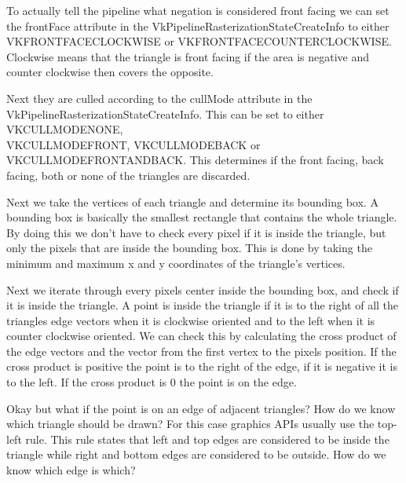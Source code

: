 \documentclass[12pt]{report} \usepackage{preamble}
\begin{document}
To actually tell the pipeline what negation is considered front facing
we can set the frontFace attribute in the VkPipelineRasterizationStateCreateInfo
to either \\
VK\textunderscore FRONT\textunderscore FACE\textunderscore CLOCKWISE or
VK\textunderscore FRONT\textunderscore FACE\textunderscore COUNTER\textunderscore CLOCKWISE.
Clockwise means that the triangle is front facing if the area is negative
and counter clockwise then covers the opposite. \cite{rasterization}

Next they are culled according to the cullMode attribute
in the VkPipelineRasterizationStateCreateInfo. This can be set to either
VK\textunderscore CULL\textunderscore MODE\textunderscore NONE, \\
VK\textunderscore CULL\textunderscore MODE\textunderscore FRONT,
VK\textunderscore CULL\textunderscore MODE\textunderscore BACK or \\
VK\textunderscore CULL\textunderscore MODE\textunderscore FRONT\textunderscore AND\textunderscore BACK.
This determines if the front facing, back facing,
both or none of the triangles are discarded. \cite{rasterization}

Next we take the vertices of each triangle and determine its bounding box.
A bounding box is basically the smallest rectangle that
contains the whole triangle. By doing this we don't have to check every pixel
if it is inside the triangle, but only the pixels that are
inside the bounding box. This is done by taking the minimum
and maximum x and y coordinates of the triangle's vertices.

Next we iterate through every pixels center inside the bounding box,
and check if it is inside the triangle.
A point is inside the triangle if it is to the right of all
the triangles edge vectors when it is clockwise oriented
and to the left when it is counter clockwise oriented.
We can check this by calculating the cross product of the edge vectors and the vector
from the first vertex to the pixels position. If the cross product is positive
the point is to the right of the edge, if it is negative it is to the left.
If the cross product is 0 the point is on the edge.

Okay but what if the point is on an edge of adjacent triangles?
How do we know which triangle should be drawn?
For this case graphics APIs usually use the top-left rule.
This rule states that left and top edges are considered to be inside the triangle
while right and bottom edges are considered to be outside. How do we know which edge is which?
\end{document}
